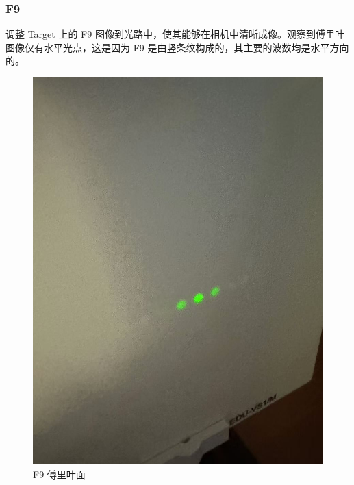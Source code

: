 \documentclass{ctexart}
\begin{document}
\subsubsection{F9}
调整 Target 上的 F9 图像到光路中，使其能够在相机中清晰成像。观察到傅里叶图像仅有水平光点，这是因为 F9 是由竖条纹构成的，其主要的波数均是水平方向的。
\begin{figure}[H]
  \centering
  \begin{minipage}[b]{0.2\textwidth}
    \centering
    \includegraphics[width=\textwidth]{pictures/微信图片_20241017164825.jpg}
    \caption{F9 傅里叶面}
  \end{minipage}
  \hspace{0.1\textwidth} %
  \begin{minipage}[b]{0.3\textwidth}
    \centering

\end{minipage}
\end{figure}
\end{document}
